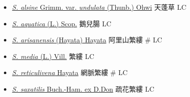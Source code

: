 \begin{itemize}
  \begin{itemize}
        \item[] \href{http://www.theplantlist.org/tpl1.1/search?q=Stellaria+alsine+var.+undulata}{\textit{S. alsine} Grimm. var. \textit{undulata} (Thunb.) Ohwi}   天蓬草   LC
        \item[] \href{http://www.theplantlist.org/tpl1.1/search?q=Stellaria+aquatica}{\textit{S. aquatica} (L.) Scop.}   鵝兒腸   LC
        \item[] \href{http://www.theplantlist.org/tpl1.1/search?q=Stellaria+arisanensis}{\textit{S. arisanensis} (Hayata) Hayata}   阿里山繁縷  \# LC
        \item[] \href{http://www.theplantlist.org/tpl1.1/search?q=Stellaria+media}{\textit{S. media} (L.) Vill.}   繁縷   LC
        \item[] \href{http://www.theplantlist.org/tpl1.1/search?q=Stellaria+reticulivena}{\textit{S. reticulivena} Hayata}   網脈繁縷  \# LC
        \item[] \href{http://www.theplantlist.org/tpl1.1/search?q=Stellaria+saxatilis}{\textit{S. saxatilis} Buch.-Ham. ex D.Don}   疏花繁縷   LC
  \end{itemize}
  \end{itemize}
